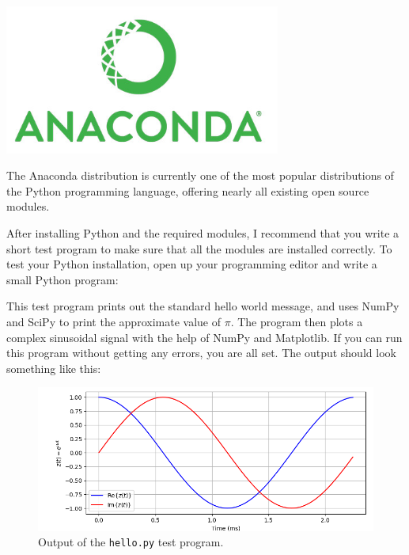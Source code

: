 \begin{marginfigure}[3cm]
\includegraphics[width=0.68\textwidth]{ch02/figures/analogo.jpg}
\caption{The Anaconda distribution is currently one of the most
  popular distributions of the Python programming language, offering
  nearly all existing open source modules.}
\end{marginfigure}

After installing Python and the required modules, I recommend that you
write a short test program to make sure that all the modules are
installed correctly. To test your Python installation, open up your
programming editor and write a small Python program:

This test program prints out the standard hello world message, and
uses NumPy and SciPy to print the approximate value of $\pi$. The program then
plots a complex sinusoidal signal with the help of NumPy and
Matplotlib.  If you can run this program without getting any errors,
you are all set. The output should look something like this:

\begin{figure}
\includegraphics[width=\textwidth]{ch02/figures/testscreen1.png}
\caption{Output of the \texttt{hello.py} test program.}
\end{figure}

